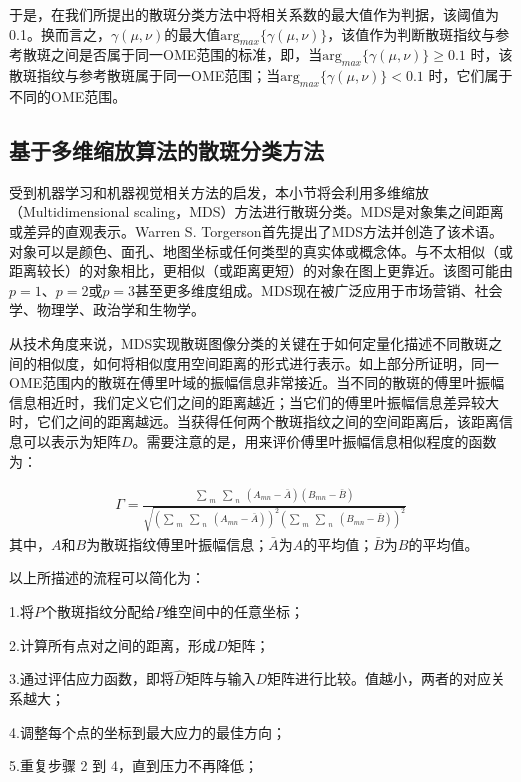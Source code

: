 于是，在我们所提出的散斑分类方法中将相关系数的最大值作为判据，该阈值为0.1。换而言之，$\gamma (\mu,\nu)$的最大值$\mbox{arg}_{max} \{ \gamma (\mu,\nu) \}$，该值作为判断散斑指纹与参考散斑之间是否属于同一OME范围的标准，即，当$\mbox{arg}_{max} \{ \gamma (\mu,\nu) \} \geq 0.1 $ 时，该散斑指纹与参考散斑属于同一OME范围；当$\mbox{arg}_{max} \{ \gamma (\mu,\nu) \} < 0.1 $ 时，它们属于不同的OME范围。

\subsection{基于多维缩放算法的散斑分类方法}\label{speckle_classify}

受到机器学习和机器视觉相关方法的启发，本小节将会利用多维缩放（Multidimensional scaling，MDS）方法进行散斑分类。MDS是对象集之间距离或差异的直观表示。Warren S. Torgerson首先提出了MDS方法并创造了该术语\cite{torgerson_multidimensional_1952}。对象可以是颜色、面孔、地图坐标或任何类型的真实体或概念体。与不太相似（或距离较长）的对象相比，更相似（或距离更短）的对象在图上更靠近。该图可能由 $p = 1$、$p = 2$或$p = 3$甚至更多维度组成。MDS现在被广泛应用于市场营销、社会学、物理学、政治学和生物学\cite{de_leeuw_modern_2005}。

从技术角度来说，MDS实现散斑图像分类的关键在于如何定量化描述不同散斑之间的相似度，如何将相似度用空间距离的形式进行表示。如上部分所证明，同一OME范围内的散斑在傅里叶域的振幅信息非常接近。当不同的散斑的傅里叶振幅信息相近时，我们定义它们之间的距离越近；当它们的傅里叶振幅信息差异较大时，它们之间的距离越远。当获得任何两个散斑指纹之间的空间距离后，该距离信息可以表示为矩阵$D$。需要注意的是，用来评价傅里叶振幅信息相似程度的函数为：

\begin{equation}
\begin{aligned}
\Gamma = \frac{\sum_{\substack{m}}\sum_{\substack{n}} (A_{mn}-\bar{A}) ( B_{mn}-\bar{B})}{\sqrt{(\sum_{\substack{m}}\sum_{\substack{n}} (A_{mn}-\bar{A}))^2 (\sum_{\substack{m}}\sum_{\substack{n}}( B_{mn}-\bar{B}))^2}}
\label{eq:6.6}
\end{aligned}
\end{equation}
其中，$A$和$B$为散斑指纹傅里叶振幅信息；$\bar{A}$为$A$的平均值；$\bar{B}$为$B$的平均值。

以上所描述的流程可以简化为：\par
1.将$P$个散斑指纹分配给$P$维空间中的任意坐标；\par
2.计算所有点对之间的距离，形成$D$矩阵；\par
3.通过评估应力函数，即将$\hat{D}$矩阵与输入$D$矩阵进行比较。值越小，两者的对应关系越大；\par
4.调整每个点的坐标到最大应力的最佳方向；\par
5.重复步骤 2 到 4，直到压力不再降低；\par

